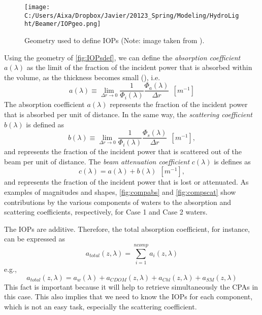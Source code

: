 \begin{figure}[htb]
\centering
\texttt{[image: C:/Users/Aixa/Dropbox/Javier/20123\_Spring/Modeling/HydroLight/Beamer/IOPgeo.png]}
\caption{Geometry used to define IOPs (Note: image taken from \cite{Mobley:2001}). \label{fig:IOPsdef} } 
\end{figure}

Using the geometry of \autoref{fig:IOPsdef}, we can define the {\it absorption coefficient}  $a(\lambda)$ as the limit of the fraction of the incident power that is absorbed within the volume, as the thickness becomes small (\cite{Mobley:2001}), i.e.
\begin{equation}
  a(\lambda)\equiv \lim_{\Delta r\to 0} \frac{1}{\Phi_i(\lambda)}\frac{\Phi_a(\lambda)}{\Delta r}~~\left[m^{-1} \right]
\end{equation}
The absorption coefficient $a(\lambda)$ represents the fraction of the incident power that is absorbed per unit of distance. In the same way, the {\it scattering coefficient}  $b(\lambda)$ is defined as
\begin{equation}
  b(\lambda)\equiv \lim_{\Delta r\to 0} \frac{1}{\Phi_i(\lambda)}\frac{\Phi_s(\lambda)}{\Delta r}~~\left[m^{-1} \right],
\end{equation}
and represents the fraction of the incident power that is scattered out of the beam per unit of distance. The {\it beam attenuation coefficient}  $c(\lambda)$ is defines as
\begin{equation}
  c(\lambda)=a(\lambda)+b(\lambda)~~\left[m^{-1} \right],
\end{equation}
and represents the fraction of the incident power that is lost or attenuated. As examples of magnitudes and shapes, \autoref{fig:compabs} and \autoref{fig:compscat} show contributions by the various components of waters to the absorption and scattering coefficients, respectively, for Case 1 and Case 2 waters.

The IOPs are additive. Therefore, the total absorption coefficient, for instance, can be expressed as
\begin{equation}
  a_{total}(z,\lambda) = \sum_{i=1}^{ncomp} a_i(z,\lambda)
\end{equation}
e.g.,
\begin{equation}\label{eq:atotal}
  a_{total}(z,\lambda) =  a_w(\lambda) +a_{CDOM}(z,\lambda)+ a_{Chl}(z,\lambda)+a_{SM}(z,\lambda)
\end{equation}
This fact is important because it will help to retrieve simultaneously the CPAs in this case. This also implies that we need to know the IOPs for each component, which is not an easy task, especially the scattering coefficient.

